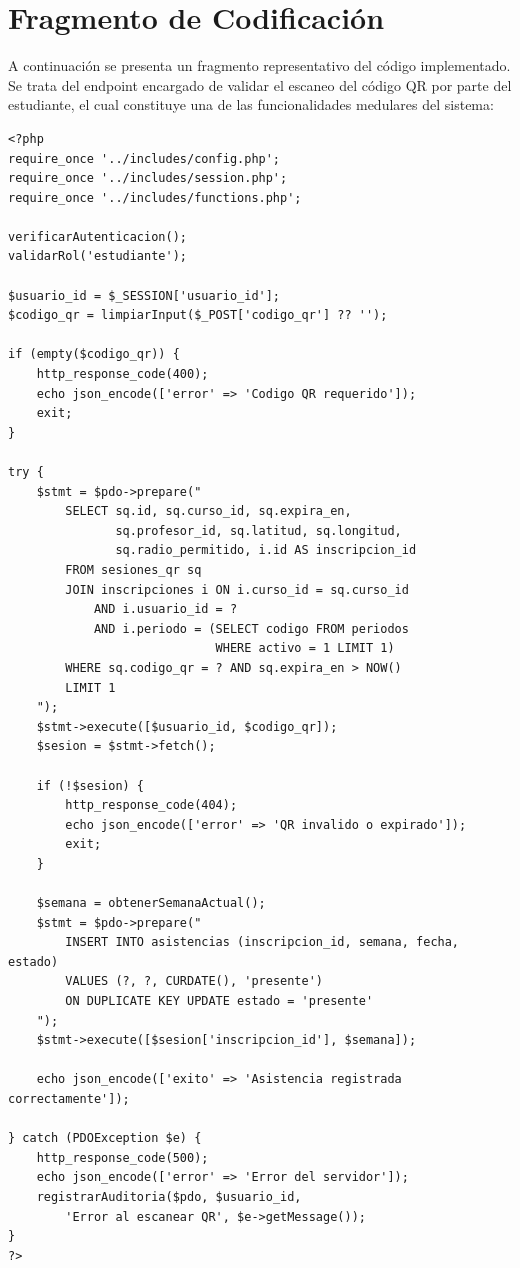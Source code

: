 \documentclass[12pt, letterpaper, oneside]{report}
\begin{document}
\section{Fragmento de Codificaci\'on}

A continuaci\'on se presenta un fragmento representativo del c\'odigo implementado. Se trata del endpoint encargado de validar el escaneo del c\'odigo QR por parte del estudiante, el cual constituye una de las funcionalidades medulares del sistema:

\begin{lstlisting}[caption=Fragmento del endpoint de escaneo QR (\texttt{estudiante/escanear\_qr.php})]
<?php
require_once '../includes/config.php';
require_once '../includes/session.php';
require_once '../includes/functions.php';

verificarAutenticacion();
validarRol('estudiante');

$usuario_id = $_SESSION['usuario_id'];
$codigo_qr = limpiarInput($_POST['codigo_qr'] ?? '');

if (empty($codigo_qr)) {
    http_response_code(400);
    echo json_encode(['error' => 'Codigo QR requerido']);
    exit;
}

try {
    $stmt = $pdo->prepare("
        SELECT sq.id, sq.curso_id, sq.expira_en,
               sq.profesor_id, sq.latitud, sq.longitud,
               sq.radio_permitido, i.id AS inscripcion_id
        FROM sesiones_qr sq
        JOIN inscripciones i ON i.curso_id = sq.curso_id
            AND i.usuario_id = ?
            AND i.periodo = (SELECT codigo FROM periodos
                             WHERE activo = 1 LIMIT 1)
        WHERE sq.codigo_qr = ? AND sq.expira_en > NOW()
        LIMIT 1
    ");
    $stmt->execute([$usuario_id, $codigo_qr]);
    $sesion = $stmt->fetch();

    if (!$sesion) {
        http_response_code(404);
        echo json_encode(['error' => 'QR invalido o expirado']);
        exit;
    }

    $semana = obtenerSemanaActual();
    $stmt = $pdo->prepare("
        INSERT INTO asistencias (inscripcion_id, semana, fecha, estado)
        VALUES (?, ?, CURDATE(), 'presente')
        ON DUPLICATE KEY UPDATE estado = 'presente'
    ");
    $stmt->execute([$sesion['inscripcion_id'], $semana]);

    echo json_encode(['exito' => 'Asistencia registrada correctamente']);

} catch (PDOException $e) {
    http_response_code(500);
    echo json_encode(['error' => 'Error del servidor']);
    registrarAuditoria($pdo, $usuario_id,
        'Error al escanear QR', $e->getMessage());
}
?>
\end{lstlisting}
\end{document}
